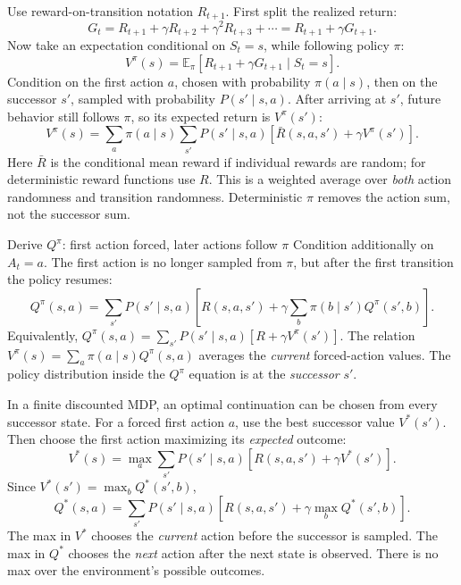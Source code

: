 \documentclass[10pt,a4paper]{article}
\newcommand{\E}{\mathbb E}
\begin{document}
\begin{prf}
Use reward-on-transition notation $R_{t+1}$. First split the realized return:
\[
G_t=R_{t+1}+\gamma R_{t+2}+\gamma^2R_{t+3}+\cdots
=R_{t+1}+\gamma G_{t+1}.
\]
Now take an expectation conditional on $S_t=s$, while following policy $\pi$:
\[
V^\pi(s)=\E_\pi[R_{t+1}+\gamma G_{t+1}\mid S_t=s].
\]
Condition on the first action $a$, chosen with probability $\pi(a\mid s)$, then on the successor $s'$, sampled with probability $P(s'\mid s,a)$. After arriving at $s'$, future behavior still follows $\pi$, so its expected return is $V^\pi(s')$:
\[
\boxed{V^\pi(s)=\sum_a\pi(a\mid s)\sum_{s'}P(s'\mid s,a)
\left[\bar R(s,a,s')+\gamma V^\pi(s')\right].}
\]
Here $\bar R$ is the conditional mean reward if individual rewards are random; for deterministic reward functions use $R$. This is a weighted average over \emph{both} action randomness and transition randomness. Deterministic $\pi$ removes the action sum, not the successor sum.
\end{prf}

\begin{card}{Derive $Q^\pi$: first action forced, later actions follow $\pi$}
Condition additionally on $A_t=a$. The first action is no longer sampled from $\pi$, but after the first transition the policy resumes:
\[
\boxed{Q^\pi(s,a)=\sum_{s'}P(s'\mid s,a)
\left[R(s,a,s')+\gamma\sum_b\pi(b\mid s')Q^\pi(s',b)\right].}
\]
Equivalently, $Q^\pi(s,a)=\sum_{s'}P(s'\mid s,a)[R+\gamma V^\pi(s')]$.
The relation $V^\pi(s)=\sum_a\pi(a\mid s)Q^\pi(s,a)$ averages the \emph{current} forced-action values. The policy distribution inside the $Q^\pi$ equation is at the \emph{successor} $s'$.
\end{card}

\begin{prf}
In a finite discounted MDP, an optimal continuation can be chosen from every successor state. For a forced first action $a$, use the best successor value $V^*(s')$. Then choose the first action maximizing its \emph{expected} outcome:
\[
\boxed{V^*(s)=\max_a\sum_{s'}P(s'\mid s,a)
[R(s,a,s')+\gamma V^*(s')].}
\]
Since $V^*(s')=\max_bQ^*(s',b)$,
\[
\boxed{Q^*(s,a)=\sum_{s'}P(s'\mid s,a)
[R(s,a,s')+\gamma\max_bQ^*(s',b)].}
\]
The max in $V^*$ chooses the \emph{current} action before the successor is sampled. The max in $Q^*$ chooses the \emph{next} action after the next state is observed. There is no max over the environment's possible outcomes.
\end{prf}
\end{document}
